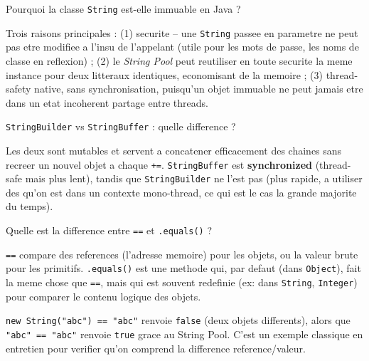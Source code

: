\documentclass[11pt,a4paper]{article}
\begin{document}
\begin{question} Pourquoi la classe \texttt{String} est-elle immuable en Java ?
\end{question}
\begin{reponse}
Trois raisons principales : (1) securite -- une \texttt{String} passee en parametre ne peut pas etre modifiee a l'insu de l'appelant (utile pour les mots de passe, les noms de classe en reflexion) ; (2) le \emph{String Pool} peut reutiliser en toute securite la meme instance pour deux litteraux identiques, economisant de la memoire ; (3) thread-safety native, sans synchronisation, puisqu'un objet immuable ne peut jamais etre dans un etat incoherent partage entre threads.
\end{reponse}

\begin{question} \texttt{StringBuilder} vs \texttt{StringBuffer} : quelle difference ?
\end{question}
\begin{reponse}
Les deux sont mutables et servent a concatener efficacement des chaines sans recreer un nouvel objet a chaque \texttt{+=}. \texttt{StringBuffer} est \textbf{synchronized} (thread-safe mais plus lent), tandis que \texttt{StringBuilder} ne l'est pas (plus rapide, a utiliser des qu'on est dans un contexte mono-thread, ce qui est le cas la grande majorite du temps).
\end{reponse}

\begin{question} Quelle est la difference entre \texttt{==} et \texttt{.equals()} ?
\end{question}
\begin{reponse}
\texttt{==} compare des references (l'adresse memoire) pour les objets, ou la valeur brute pour les primitifs. \texttt{.equals()} est une methode qui, par defaut (dans \texttt{Object}), fait la meme chose que \texttt{==}, mais qui est souvent redefinie (ex: dans \texttt{String}, \texttt{Integer}) pour comparer le contenu logique des objets.
\end{reponse}

\begin{piege}
\texttt{new String("abc") == "abc"} renvoie \texttt{false} (deux objets differents), alors que \texttt{"abc" == "abc"} renvoie \texttt{true} grace au String Pool. C'est un exemple classique en entretien pour verifier qu'on comprend la difference reference/valeur.
\end{piege}
\end{document}

